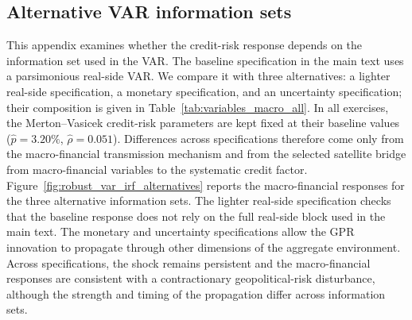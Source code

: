 
\subsection{Alternative VAR information sets}
\label{app:alternative_information_sets}
This appendix examines whether the credit-risk response depends on the
information set used in the VAR. The baseline specification in the main text
uses a parsimonious real-side VAR. We compare it with three alternatives: a
lighter real-side specification, a monetary specification, and an uncertainty
specification; their composition is given in
Table~\ref{tab:variables_macro_all}. In all exercises, the Merton--Vasicek
credit-risk parameters are kept fixed at their baseline values
($\widehat p=3.20\%$, $\widehat\rho=0.051$). Differences across
specifications therefore come only from the macro-financial transmission
mechanism and from the selected satellite bridge from macro-financial
variables to the systematic credit factor.
Figure~\ref{fig:robust_var_irf_alternatives} reports the macro-financial
responses for the three alternative information sets. The lighter real-side
specification checks that the baseline response does not rely on the full
real-side block used in the main text. The monetary and uncertainty
specifications allow the GPR innovation to propagate through other dimensions
of the aggregate environment. Across specifications, the shock remains
persistent and the macro-financial responses are consistent with a
contractionary geopolitical-risk disturbance, although the strength and
timing of the propagation differ across information sets.
